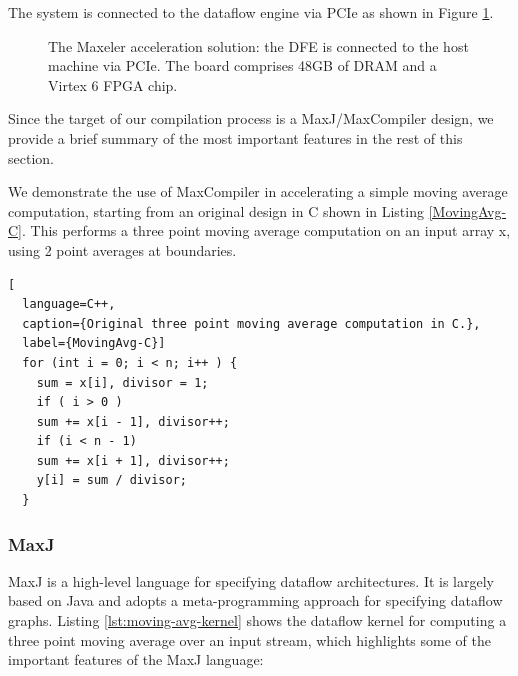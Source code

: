 The system is connected to the dataflow engine via PCIe as shown in
Figure \ref{fig:max3}.

\begin{figure}[!ht]
\vspace{-2cm}
  \centering
  \def\svgwidth{\textwidth}
  
\vspace{-2cm}
 \caption{
    The Maxeler acceleration solution: the DFE is connected to
    the host machine via PCIe. The board comprises 48GB of DRAM and a
    Virtex 6 FPGA chip. }
  \label{fig:max3}
\end{figure}


Since the target of our compilation process is a MaxJ/MaxCompiler
design, we provide a brief summary of the most important features in
the rest of this section.

We demonstrate the use of MaxCompiler in accelerating a simple moving
average computation, starting from an original design in C shown in
Listing \ref{MovingAvg-C}. This performs a three point moving average
computation on an input array x, using 2 point averages at boundaries.

\begin{lstlisting}[
  language=C++,
  caption={Original three point moving average computation in C.},
  label={MovingAvg-C}]
  for (int i = 0; i < n; i++ ) {
    sum = x[i], divisor = 1;
    if ( i > 0 )
    sum += x[i - 1], divisor++;
    if (i < n - 1)
    sum += x[i + 1], divisor++;
    y[i] = sum / divisor;
  }
\end{lstlisting}

\subsubsection{MaxJ}

MaxJ is a high-level language for specifying dataflow
architectures. It is largely based on Java and adopts a
meta-programming approach for specifying dataflow graphs.  Listing
\ref{lst:moving-avg-kernel} shows the dataflow kernel for computing a
three point moving average over an input stream, which highlights some
of the important features of the MaxJ language:


